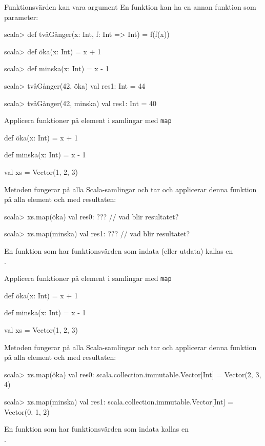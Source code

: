 \begin{Slide}{Funktionsvärden kan vara argument}
	En funktion kan ha en annan funktion som parameter:
	\begin{REPL}
		scala> def tvåGånger(x: Int, f: Int => Int) = f(f(x))

		scala> def öka(x: Int) = x + 1

		scala> def minska(x: Int) = x - 1

		scala> tvåGånger(42, öka)
		val res1: Int = 44

		scala> tvåGånger(42, minska)
		val res1: Int = 40
	\end{REPL}
\end{Slide}

\begin{Slide}{Applicera funktioner på element i samlingar med \texttt{map}}\SlideFontSmall
	\begin{Code}
		def öka(x: Int) = x + 1

		def minska(x: Int) = x - 1

		val xs = Vector(1, 2, 3)
	\end{Code}
	\pause
	Metoden  fungerar på alla Scala-samlingar och tar  och applicerar denna funktion på alla element och  med resultaten:
	\begin{REPL}
		scala> xs.map(öka)
		val res0: ???   // vad blir resultatet?

		scala> xs.map(minska)
		val res1: ???   // vad blir resultatet?
	\end{REPL}
	En funktion som har funktionsvärden som indata (eller utdata) kallas en\\   .
\end{Slide}

\begin{Slide}{Applicera funktioner på element i samlingar med \texttt{map}}\SlideFontSmall
	\begin{Code}
		def öka(x: Int) = x + 1

		def minska(x: Int) = x - 1

		val xs = Vector(1, 2, 3)
	\end{Code}
	Metoden  fungerar på alla Scala-samlingar och tar  och applicerar denna funktion på alla element och  med resultaten:
	\begin{REPL}
		scala> xs.map(öka)
		val res0: scala.collection.immutable.Vector[Int] = Vector(2, 3, 4)

		scala> xs.map(minska)
		val res1: scala.collection.immutable.Vector[Int] = Vector(0, 1, 2)
	\end{REPL}
	En funktion som har funktionsvärden som indata kallas en\\   .
\end{Slide}

